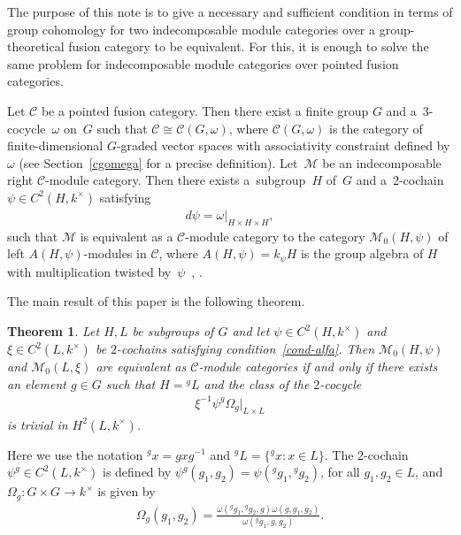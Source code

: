 \documentclass[11pt]{article}
\numberwithin{equation}{section}
\newtheorem{Theorem}{Theorem}[section]
\newcommand{\cch}{\Omega}
\newcommand{\C}{{\mathcal C}}
\newcommand{\M}{{\mathcal M}}
\newcommand{\1}{\textbf{1}}
\begin{document}
The purpose of this note is to give a necessary and suf\/f\/icient condition in terms of group cohomology for two indecomposable module categories over a group-theoretical fusion category to be equivalent. For this, it is enough to solve the same problem for indecomposable module categories over pointed fusion categories.

Let $\C$ be a pointed fusion category. Then there exist a f\/inite group $G$ and a~3-cocycle~$\omega$ on~$G$ such that $\C \cong \C(G, \omega)$, where $\C(G, \omega)$ is the category of f\/inite-dimensional $G$-graded vector spaces with associativity constraint def\/ined by $\omega$ (see Section~\ref{cgomega} for a precise def\/inition). Let~$\M$ be an indecomposable right $\C$-module category. Then there exists a~subgroup~$H$ of~$G$ and a~2-cochain $\psi \in C^2(H, k^{\times})$ satisfying
\begin{gather}
\label{cond-alfa}d\psi = \omega\vert_{H \times H \times H},
\end{gather}
such that $\M$ is equivalent as a $\C$-module category to the category $\M_0(H, \psi)$ of left $A(H, \psi)$-modules in $\C$, where $A(H, \psi) = k_\psi H$ is the group algebra of $H$ with multiplication twisted by~$\psi$~\cite{ostrik}, \cite[Example~9.7.2]{egno}.

The main result of this paper is the following theorem.

\begin{Theorem}\label{main} Let $H, L$ be subgroups of $G$ and let $\psi \in C^2(H, k^{\times})$ and $\xi \in C^2(L, k^{\times})$ be $2$-cochains satisfying condition~\eqref{cond-alfa}. Then $\M_0(H, \psi)$ and $\M_0(L, \xi)$ are equivalent as $\C$-module categories if and only if there exists an element $g \in G$ such that $H = {}^gL$ and the class of the $2$-cocycle
\begin{gather}\label{cond-equiv} {\xi}^{-1}{\psi}^g \cch_g\vert_{L\times L}
\end{gather}
is trivial in $H^2(L, k^{\times})$.
\end{Theorem}

Here we use the notation ${}^g x = gxg^{-1}$ and $^gL = \{{}^g x\colon x\in L\}$. The 2-cochain ${\psi}^g \in C^2(L, k^{\times})$ is def\/ined by ${\psi}^g(g_1, g_2) = {\psi}({}^gg_1, {}^gg_2)$, for all $g_1, g_2 \in L$, and $\cch_g\colon G \times G \to k^{\times}$ is given by
\begin{gather*}\cch_g(g_1, g_2) = \frac{\omega({}^gg_1, {}^gg_2, g) \omega(g, g_1, g_2)}{\omega({}^gg_1, g, g_2)}.
\end{gather*}
\end{document}
